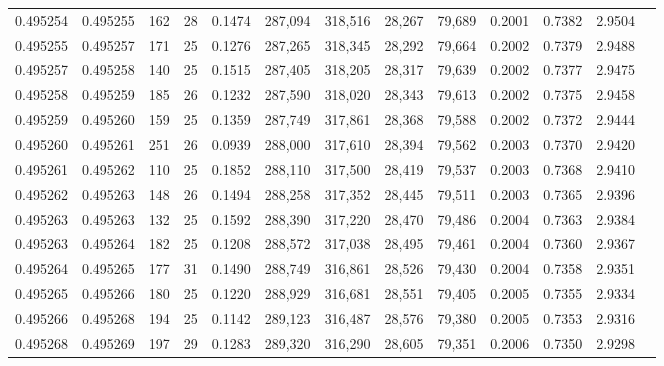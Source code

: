\begin{tabular}{rrrrrrrrrrrrr}
0.495254 & 0.495255 & 162 &  28 &                                     0.1474 & 287,094 & 318,516 &  28,267 &  79,689 & 0.2001 & 0.7382 & 2.9504 \\
0.495255 & 0.495257 & 171 &  25 &                                     0.1276 & 287,265 & 318,345 &  28,292 &  79,664 & 0.2002 & 0.7379 & 2.9488 \\
0.495257 & 0.495258 & 140 &  25 &                                     0.1515 & 287,405 & 318,205 &  28,317 &  79,639 & 0.2002 & 0.7377 & 2.9475 \\
0.495258 & 0.495259 & 185 &  26 &                                     0.1232 & 287,590 & 318,020 &  28,343 &  79,613 & 0.2002 & 0.7375 & 2.9458 \\
0.495259 & 0.495260 & 159 &  25 &                                     0.1359 & 287,749 & 317,861 &  28,368 &  79,588 & 0.2002 & 0.7372 & 2.9444 \\
0.495260 & 0.495261 & 251 &  26 &                                     0.0939 & 288,000 & 317,610 &  28,394 &  79,562 & 0.2003 & 0.7370 & 2.9420 \\
0.495261 & 0.495262 & 110 &  25 &                                     0.1852 & 288,110 & 317,500 &  28,419 &  79,537 & 0.2003 & 0.7368 & 2.9410 \\
0.495262 & 0.495263 & 148 &  26 &                                     0.1494 & 288,258 & 317,352 &  28,445 &  79,511 & 0.2003 & 0.7365 & 2.9396 \\
0.495263 & 0.495263 & 132 &  25 &                                     0.1592 & 288,390 & 317,220 &  28,470 &  79,486 & 0.2004 & 0.7363 & 2.9384 \\
0.495263 & 0.495264 & 182 &  25 &                                     0.1208 & 288,572 & 317,038 &  28,495 &  79,461 & 0.2004 & 0.7360 & 2.9367 \\
0.495264 & 0.495265 & 177 &  31 &                                     0.1490 & 288,749 & 316,861 &  28,526 &  79,430 & 0.2004 & 0.7358 & 2.9351 \\
0.495265 & 0.495266 & 180 &  25 &                                     0.1220 & 288,929 & 316,681 &  28,551 &  79,405 & 0.2005 & 0.7355 & 2.9334 \\
0.495266 & 0.495268 & 194 &  25 &                                     0.1142 & 289,123 & 316,487 &  28,576 &  79,380 & 0.2005 & 0.7353 & 2.9316 \\
0.495268 & 0.495269 & 197 &  29 &                                     0.1283 & 289,320 & 316,290 &  28,605 &  79,351 & 0.2006 & 0.7350 & 2.9298 \\

\end{tabular}

